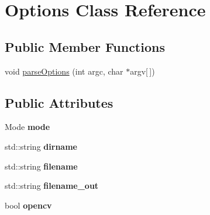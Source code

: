 \hypertarget{class_options}{\section{Options Class Reference}
\label{class_options}
}
\subsection*{Public Member Functions}
\begin{DoxyCompactItemize}
\item 
void \hyperlink{class_options_a7701ddbb75e657966bf176ab0f1183b4}{parse\-Options} (int argc, char $\ast$argv\mbox{[}$\,$\mbox{]})
\end{DoxyCompactItemize}
\subsection*{Public Attributes}
\begin{DoxyCompactItemize}
\item 
\hypertarget{class_options_a9a58aaf042bb389d7281c06d02395422}{Mode {\bfseries mode}}\label{class_options_a9a58aaf042bb389d7281c06d02395422}

\item 
\hypertarget{class_options_aadaf3a69ffb9763fc71849c25b2e7e85}{std\-::string {\bfseries dirname}}\label{class_options_aadaf3a69ffb9763fc71849c25b2e7e85}

\item 
\hypertarget{class_options_a95862fcb08ac7b0e96bae8da9533881f}{std\-::string {\bfseries filename}}\label{class_options_a95862fcb08ac7b0e96bae8da9533881f}

\item 
\hypertarget{class_options_aa77345a06d87bdedf2624faab13f1986}{std\-::string {\bfseries filename\-\_\-out}}\label{class_options_aa77345a06d87bdedf2624faab13f1986}

\item 
\hypertarget{class_options_a7aa130540b21e51e2cf7da59bd3b0a53}{bool {\bfseries opencv}}\label{class_options_a7aa130540b21e51e2cf7da59bd3b0a53}

\end{DoxyCompactItemize}


